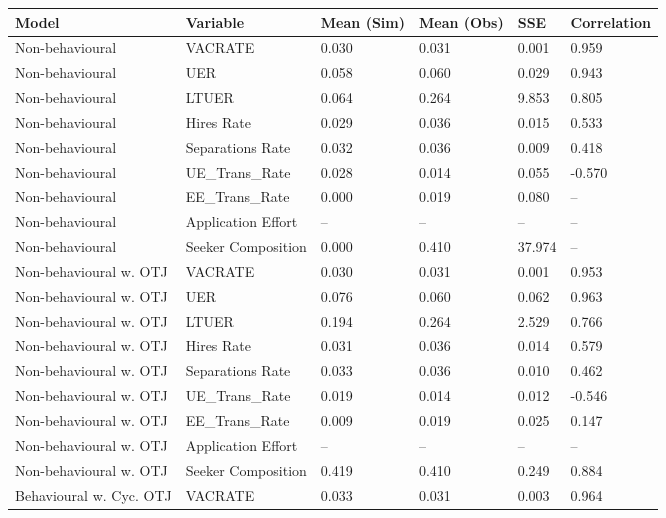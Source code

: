 \begin{table}[ht]
\centering
\begin{adjustbox}{width=\textwidth}
\begin{tabular}{llllll}
\toprule
Model & Variable & Mean (Sim) & Mean (Obs) & SSE & Correlation \\
\midrule
Non-behavioural & VACRATE & \cellcolor{yellow!25}0.030 & 0.031 & \cellcolor{yellow!25}0.001 & 0.959 \\
Non-behavioural & UER & \cellcolor{yellow!25}0.058 & 0.060 & 0.029 & 0.943 \\
Non-behavioural & LTUER & 0.064 & 0.264 & 9.853 & 0.805 \\
Non-behavioural & Hires Rate & 0.029 & 0.036 & 0.015 & 0.533 \\
Non-behavioural & Separations Rate & 0.032 & 0.036 & \cellcolor{yellow!25}0.009 & 0.418 \\
Non-behavioural & UE_Trans_Rate & 0.028 & 0.014 & 0.055 & -0.570 \\
Non-behavioural & EE_Trans_Rate & 0.000 & 0.019 & 0.080 & -- \\
Non-behavioural & Application Effort & -- & -- & -- & -- \\
Non-behavioural & Seeker Composition & 0.000 & 0.410 & 37.974 & -- \\
Non-behavioural w. OTJ & VACRATE & 0.030 & 0.031 & 0.001 & 0.953 \\
Non-behavioural w. OTJ & UER & 0.076 & 0.060 & 0.062 & \cellcolor{yellow!25}0.963 \\
Non-behavioural w. OTJ & LTUER & \cellcolor{yellow!25}0.194 & 0.264 & 2.529 & 0.766 \\
Non-behavioural w. OTJ & Hires Rate & \cellcolor{yellow!25}0.031 & 0.036 & \cellcolor{yellow!25}0.014 & 0.579 \\
Non-behavioural w. OTJ & Separations Rate & \cellcolor{yellow!25}0.033 & 0.036 & 0.010 & 0.462 \\
Non-behavioural w. OTJ & UE_Trans_Rate & 0.019 & 0.014 & 0.012 & -0.546 \\
Non-behavioural w. OTJ & EE_Trans_Rate & 0.009 & 0.019 & 0.025 & 0.147 \\
Non-behavioural w. OTJ & Application Effort & -- & -- & -- & -- \\
Non-behavioural w. OTJ & Seeker Composition & \cellcolor{yellow!25}0.419 & 0.410 & \cellcolor{yellow!25}0.249 & \cellcolor{yellow!25}0.884 \\
Behavioural w. Cyc. OTJ & VACRATE & 0.033 & 0.031 & 0.003 & \cellcolor{yellow!25}0.964 \\

\end{tabular}
\end{adjustbox}
\end{table}
